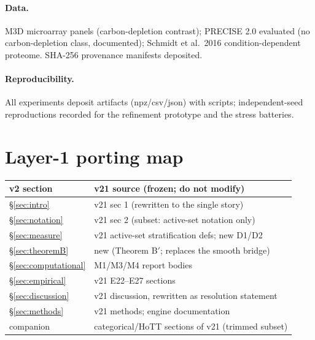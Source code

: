 \documentclass[11pt,a4paper]{article}
\theoremstyle{plain}
\theoremstyle{definition}
\theoremstyle{remark}
\begin{document}
\paragraph{Data.} M3D microarray panels (carbon-depletion contrast);
PRECISE 2.0 evaluated (no carbon-depletion class, documented); Schmidt
et al.\ 2016 condition-dependent proteome. SHA-256 provenance manifests
deposited.

\paragraph{Reproducibility.} All experiments deposit artifacts
(npz/csv/json) with scripts; independent-seed reproductions recorded for
the refinement prototype and the stress batteries.

\appendix
\section{Layer-1 porting map}\label{sec:portmap}

\begin{tabularx}{\textwidth}{lX}
\toprule
\textbf{v2 section} & \textbf{v21 source (frozen; do not modify)} \\
\midrule
\S\ref{sec:intro} & v21 sec 1 (rewritten to the single story) \\
\S\ref{sec:notation} & v21 sec 2 (subset: active-set notation only) \\
\S\ref{sec:measure} & v21 active-set stratification defs; new D1/D2 \\
\S\ref{sec:theoremB} & new (Theorem B$'$; replaces the smooth bridge) \\
\S\ref{sec:computational} & M1/M3/M4 report bodies \\
\S\ref{sec:empirical} & v21 E22--E27 sections \\
\S\ref{sec:discussion} & v21 discussion, rewritten as resolution statement \\
\S\ref{sec:methods} & v21 methods; engine documentation \\
companion & categorical/HoTT sections of v21 (trimmed subset) \\
\bottomrule
\end{tabularx}
\end{document}
